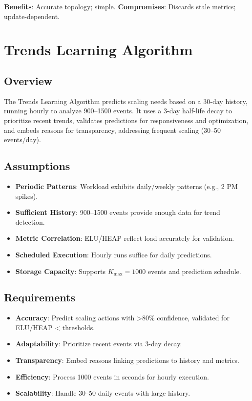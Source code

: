 \documentclass[12pt]{article}
\begin{document}
\textbf{Benefits}: Accurate topology; simple.
\textbf{Compromises}: Discards stale metrics; update-dependent.

\section{Trends Learning Algorithm}
\subsection{Overview}
The Trends Learning Algorithm predicts scaling needs based on a 30-day history, running hourly to analyze 900–1500 events. It uses a 3-day half-life decay to prioritize recent trends, validates predictions for responsiveness and optimization, and embeds reasons for transparency, addressing frequent scaling (30–50 events/day).

\subsection{Assumptions}
\begin{itemize}
    \item \textbf{Periodic Patterns}: Workload exhibits daily/weekly patterns (e.g., 2 PM spikes).
    \item \textbf{Sufficient History}: 900–1500 events provide enough data for trend detection.
    \item \textbf{Metric Correlation}: ELU/HEAP reflect load accurately for validation.
    \item \textbf{Scheduled Execution}: Hourly runs suffice for daily predictions.
    \item \textbf{Storage Capacity}: Supports $K_{\text{max}} = 1000$ events and prediction schedule.
\end{itemize}

\subsection{Requirements}
\begin{itemize}
    \item \textbf{Accuracy}: Predict scaling actions with >80\% confidence, validated for ELU/HEAP < thresholds.
    \item \textbf{Adaptability}: Prioritize recent events via 3-day decay.
    \item \textbf{Transparency}: Embed reasons linking predictions to history and metrics.
    \item \textbf{Efficiency}: Process 1000 events in seconds for hourly execution.
    \item \textbf{Scalability}: Handle 30–50 daily events with large history.
\end{itemize}
\end{document}
